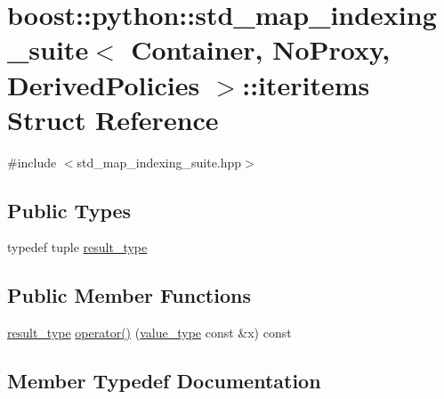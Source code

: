 \hypertarget{structboost_1_1python_1_1std__map__indexing__suite_1_1iteritems}{}\section{boost\+:\+:python\+:\+:std\+\_\+map\+\_\+indexing\+\_\+suite$<$ Container, No\+Proxy, Derived\+Policies $>$\+:\+:iteritems Struct Reference}
\label{structboost_1_1python_1_1std__map__indexing__suite_1_1iteritems}


{\ttfamily \#include $<$std\+\_\+map\+\_\+indexing\+\_\+suite.\+hpp$>$}

\subsection*{Public Types}
\begin{DoxyCompactItemize}
\item 
typedef tuple \hyperlink{structboost_1_1python_1_1std__map__indexing__suite_1_1iteritems_a97f1c788acd4c665fba8ae1fcc946a45}{result\+\_\+type}
\end{DoxyCompactItemize}
\subsection*{Public Member Functions}
\begin{DoxyCompactItemize}
\item 
\hyperlink{structboost_1_1python_1_1std__map__indexing__suite_1_1iteritems_a97f1c788acd4c665fba8ae1fcc946a45}{result\+\_\+type} \hyperlink{structboost_1_1python_1_1std__map__indexing__suite_1_1iteritems_a4adb01be48bc47d6c1636957267fdca2}{operator()} (\hyperlink{classboost_1_1python_1_1std__map__indexing__suite_aff9ed68cf30e805a04a313d92c62ab38}{value\+\_\+type} const \&x) const 
\end{DoxyCompactItemize}


\subsection{Member Typedef Documentation}
